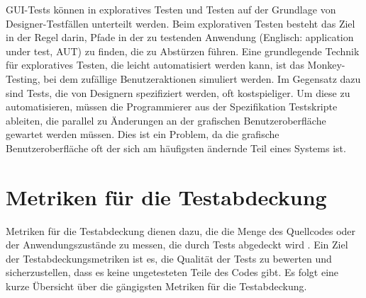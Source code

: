 GUI-Tests können in exploratives Testen und Testen auf der Grundlage von Designer-Testfällen unterteilt werden.
Beim explorativen Testen besteht das Ziel in der Regel darin, Pfade in der zu testenden Anwendung (Englisch: \foreignlanguage{english}{application under test}, AUT) zu finden, die zu Abstürzen führen.
Eine grundlegende Technik für exploratives Testen, die leicht automatisiert werden kann, ist das Monkey-Testing, bei dem zufällige Benutzeraktionen simuliert werden.
Im Gegensatz dazu sind Tests, die von Designern spezifiziert werden, oft kostspieliger.
Um diese zu automatisieren, müssen die Programmierer aus der Spezifikation Testskripte ableiten, die parallel zu Änderungen an der grafischen Benutzeroberfläche gewartet werden müssen.
Dies ist ein Problem, da die grafische Benutzeroberfläche oft der sich am häufigsten ändernde Teil eines Systems ist.

\section{Metriken für die Testabdeckung}
\label{sec:Foundations:TestCoverageMetrics}

Metriken für die Testabdeckung dienen dazu, die die Menge des Quellcodes oder der Anwendungszustände zu messen, die durch Tests abgedeckt wird \cite{Sommerville10}.
Ein Ziel der Testabdeckungsmetriken ist es, die Qualität der Tests zu bewerten  und sicherzustellen, dass es keine ungetesteten Teile des Codes gibt.
Es folgt eine kurze Übersicht über die gängigsten Metriken für die Testabdeckung.

